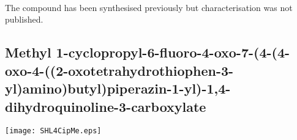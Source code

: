 \\[1\baselineskip]
\\[1\baselineskip]
\\[1\baselineskip]
The compound has been synthesised previously\cite{Ganguly2011,Iyer2012} but characterisation was not published.



\subsection{Methyl 1\hyp{}cyclopropyl\hyp{}6\hyp{}fluoro\hyp{}4\hyp{}oxo\hyp{}7\hyp{}(4\hyp{}(4\hyp{}oxo\hyp{}4\hyp{}((2\hyp{}oxotetrahydrothiophen\hyp{}3\hyp{}yl)amino)butyl)pip\allowbreak erazin\hyp{}1\hyp{}yl)\hyp{}1,4\hyp{}dihydroquinoline\hyp{}3\hyp{}carboxylate }


\begin{scheme}[H]
	\begin{center}
		\texttt{[image: SHL4CipMe.eps]}
	\end{center}
\end{scheme}

